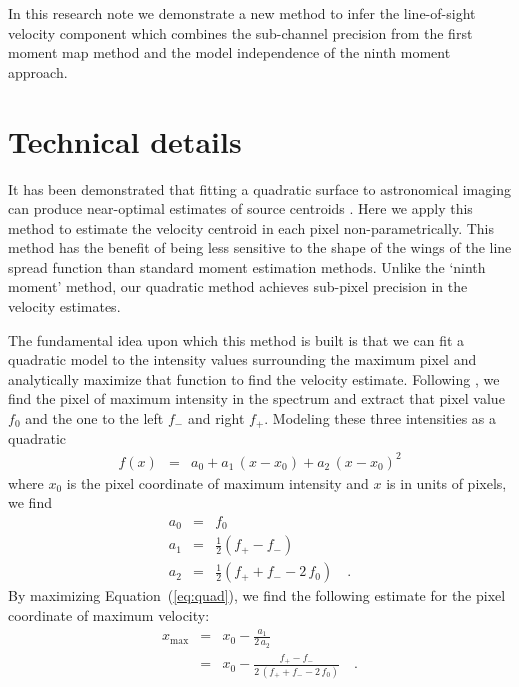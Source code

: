 \documentclass[rnaas]{aastex62}
\renewcommand{\eqref}[1]{\ref{eq:#1}}
\newcommand{\Eq}[1]{Equation~(\eqref{#1})}
\newcommand{\eqlabel}[1]{\label{eq:#1}}
\begin{document}
In this research note we demonstrate a new method to infer the line-of-sight velocity component which combines the sub-channel precision from the first moment map method and the model independence of the ninth moment approach.

\section{Technical details}

It has been demonstrated that fitting a quadratic surface to astronomical
imaging can produce near-optimal estimates of source centroids
\citep{Vakili:2016}.
Here we apply this method to estimate the velocity centroid in each pixel
non-parametrically.
This method has the benefit of being less sensitive to the shape of the wings
of the line spread function than standard moment estimation methods.
Unlike the `ninth moment' method, our quadratic method achieves sub-pixel
precision in the velocity estimates.

The fundamental idea upon which this method is built is that we can fit a
quadratic model to the intensity values surrounding the maximum pixel and
analytically maximize that function to find the velocity estimate.
Following \citet{Vakili:2016}, we find the pixel of maximum intensity in the
spectrum and extract that pixel value $f_0$ and the one to the left $f_-$ and
right $f_+$.
Modeling these three intensities as a quadratic
\begin{eqnarray}
f(x) &=& a_0 + a_1\,(x-x_0) + a_2\,{(x-x_0)}^2
\eqlabel{quad}
\end{eqnarray}
where $x_0$ is the pixel coordinate of maximum intensity and $x$ is in units
of pixels, we find
\begin{eqnarray}
a_0 &=& f_0 \\
a_1 &=& \frac{1}{2}(f_+ - f_-) \\
a_2 &=& \frac{1}{2}(f_+ + f_- - 2\,f_0) \quad.
\end{eqnarray}
By maximizing \Eq{quad}, we find the following estimate for the pixel
coordinate of maximum velocity:
\begin{eqnarray}
x_\mathrm{max} &=& x_0 - \frac{a_1}{2\,a_2} \\
    &=& x_0 - \frac{f_+ - f_-}{2\,(f_+ + f_- - 2\,f_0)} \quad.
\end{eqnarray}
\end{document}
